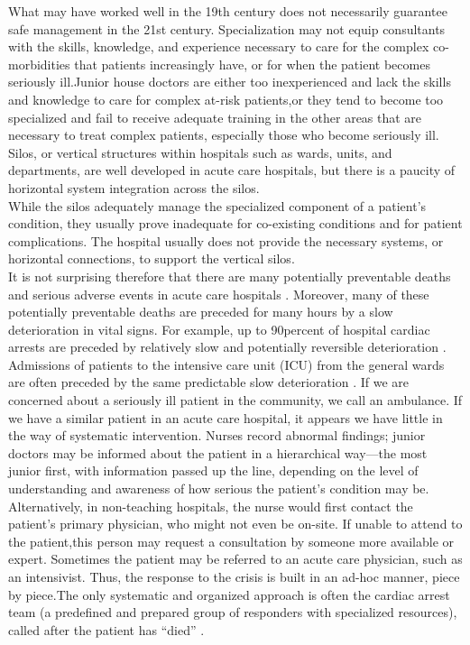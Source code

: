 \documentclass[a4paper,12pt]{report}
\begin{document}
What may have worked well in the 19th century does not necessarily guarantee safe management in the 21st century. Specialization may not equip consultants with the skills, knowledge, and experience necessary to care for the complex co-morbidities that patients increasingly have, or for when the patient becomes seriously ill.Junior house doctors are either too inexperienced and lack the skills and knowledge to care for complex at-risk patients,or they tend to become too specialized and fail to receive adequate training in the other areas that are necessary to treat complex patients, especially those who become seriously ill. Silos, or vertical structures within hospitals such as wards, units, and departments, are well developed in acute care hospitals, but there is a paucity of horizontal system integration across the silos.\\

While the silos adequately manage the specialized component of a patient’s condition, they usually prove inadequate for co-existing conditions and for patient complications. The hospital usually does not provide the necessary systems, or horizontal connections, to support the vertical silos.\\

It is not surprising therefore that there are many potentially preventable deaths and serious adverse events in acute care hospitals . Moreover, many of these potentially preventable deaths are preceded for many hours by a slow deterioration in vital signs. For example, up to 90percent of hospital cardiac arrests are preceded by relatively slow and potentially reversible deterioration . Admissions of patients to the intensive care unit (ICU) from the general wards are often preceded by the same predictable slow deterioration . If we are concerned about a seriously ill patient in the community, we call an ambulance. If we have a similar patient in an acute
care hospital, it appears we have little in the way of systematic intervention. Nurses record abnormal findings; junior doctors may be informed about the patient in a hierarchical way—the most junior first, with information passed up the line, depending on the level of understanding and awareness of how serious the patient’s condition may be. Alternatively, in non-teaching hospitals, the nurse would first contact the patient’s primary physician, who might not even be on-site. If unable to attend to the patient,this person may request a consultation by someone more available or expert. Sometimes the patient may be referred to an acute care physician, such as an intensivist. Thus, the response to the crisis is built in an ad-hoc manner, piece by piece.The only systematic and organized approach is often the cardiac arrest team (a predefined and prepared group of responders
with specialized resources), called after the patient has “died” .\\
\end{document}
